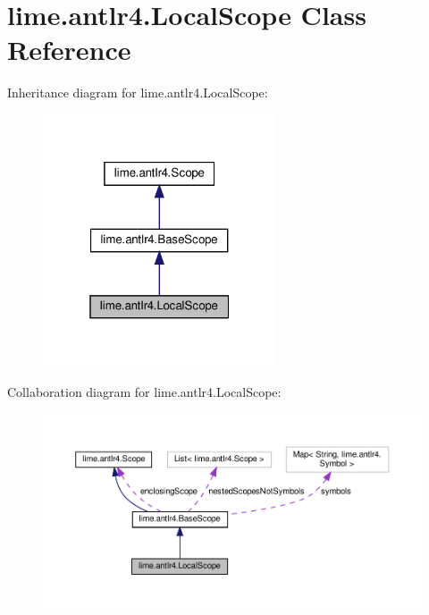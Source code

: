 \hypertarget{classlime_1_1antlr4_1_1LocalScope}{}\section{lime.\+antlr4.\+Local\+Scope Class Reference}
\label{classlime_1_1antlr4_1_1LocalScope}


Inheritance diagram for lime.\+antlr4.\+Local\+Scope\+:
\nopagebreak
\begin{figure}[H]
\begin{center}
\leavevmode
\includegraphics[width=196pt]{classlime_1_1antlr4_1_1LocalScope__inherit__graph}
\end{center}
\end{figure}


Collaboration diagram for lime.\+antlr4.\+Local\+Scope\+:
\nopagebreak
\begin{figure}[H]
\begin{center}
\leavevmode
\includegraphics[width=350pt]{classlime_1_1antlr4_1_1LocalScope__coll__graph}
\end{center}
\end{figure}
